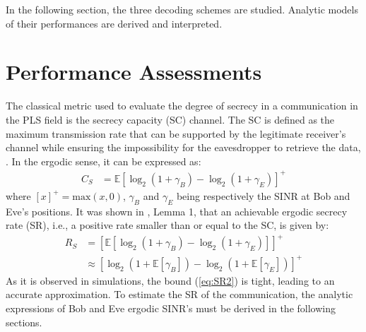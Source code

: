 \documentclass[journal,comsoc]{IEEEtran}
\let\MYoriglatexcaption\caption
\renewcommand{\caption}[2][\relax]{\MYoriglatexcaption[#2]{#2}}
\newcommand{\EX}[1]{\mathbb{E} \left[#1\right]}%
\begin{document}
In the following section, the three decoding schemes are studied. Analytic models of their performances are derived and interpreted.




%
%
%










\section{Performance Assessments}
\label{sec:perf}
The classical metric used to evaluate the degree of secrecy in a communication in the PLS field is the secrecy capacity (SC)  channel. The SC is defined as the maximum transmission rate that can be supported by the legitimate receiver's channel while ensuring the impossibility for the eavesdropper to retrieve the data, \cite{7348007}. In the ergodic sense, it can be expressed as:
\begin{equation}
\begin{split}
C_S &=  \EX{\log_2{\left(1+\gamma_B\right)} - \log_2{\left(1+\gamma_E\right)}}^+ 
\end{split}
\label{eq:SR}
\end{equation}
where $\left[x\right]^+ = \text{max}(x,0)$,  $\gamma_B$ and $\gamma_E$ being respectively the SINR at Bob and Eve's positions.  It was shown in \cite{8418798}, Lemma 1, that an achievable ergodic secrecy rate (SR), i.e., a positive rate smaller than or equal to the SC, is given by:
\begin{equation}
	\begin{split}
		R_S& = \left[\EX{\log_2(1+\gamma_B)-\log_2(1+\gamma_E)}\right]^+ \\
		& \approx \left[ \log_2(1 + \EX{\gamma_B}) - \log_2(1 + \EX{\gamma_E})\right]^+
	\end{split}
	\label{eq:SR2}
\end{equation}
As it is observed in simulations, the bound (\ref{eq:SR2}) is tight, leading to an accurate approximation. To estimate the SR of the communication, the analytic expressions of Bob and Eve ergodic SINR's must be derived in the following sections.
\end{document}
